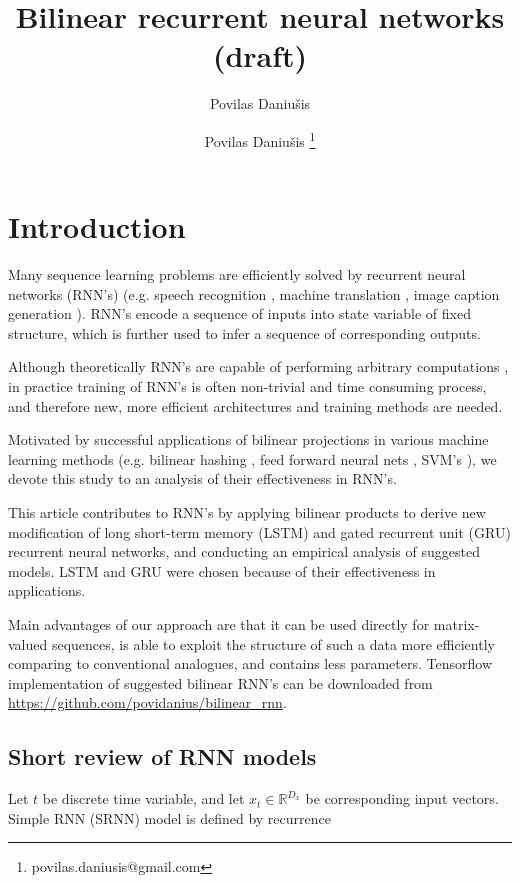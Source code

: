 \documentclass[a4paper,11pt]{article}
\author{Povilas Daniu\v{s}is}
\author[1]{Povilas Daniu\v{s}is \thanks{povilas.daniusis@gmail.com}}
\title{Bilinear recurrent neural networks (draft)}
\begin{document}
\maketitle
\section{Introduction}

Many sequence learning problems are efficiently solved by recurrent neural networks (RNN's) (e.g. speech recognition \cite{Sak}, machine translation \cite{Sutskever}, image caption generation \cite{Vinyals}). RNN's encode a sequence of inputs into state variable of fixed structure, which is further used to infer a sequence of corresponding outputs. 



Although theoretically RNN's are capable of performing arbitrary computations \cite{Siegelmann}, in practice training of RNN's is often non-trivial and time consuming process, and therefore new, more efficient architectures and training methods are needed.



Motivated by successful applications of bilinear projections in
various machine learning methods (e.g. bilinear hashing \cite{Gong}, feed forward neural nets \cite{Daniusis}, SVM's \cite{Cai}), we devote this study to an analysis of their effectiveness in RNN's.


This article contributes to RNN's by applying bilinear products to derive new modification of long short-term memory (LSTM) \cite{Hochreiter} and gated recurrent unit (GRU) \cite{Chung} recurrent neural networks, and conducting an empirical analysis of suggested models. LSTM and GRU were chosen because of their effectiveness in applications.

Main advantages of our approach are that it can be used directly for matrix-valued sequences, is able to exploit the structure of such a data more efficiently comparing to conventional analogues, and contains less parameters. Tensorflow \cite{Tensorflow} implementation of suggested bilinear RNN's can be downloaded from \url{https://github.com/povidanius/bilinear_rnn}.




\subsection{Short review of RNN models}

Let $t$ be discrete time variable, and let $x_{t} \in \mathbb{R}^{D_{x}}$ be corresponding input vectors. Simple RNN (SRNN) model is defined by 
recurrence 
\end{document}
